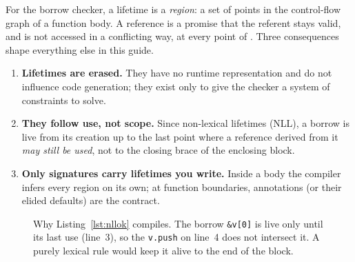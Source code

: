 \documentclass[10.5pt,a4paper]{article}
\newcounter{lst}
\begin{document}
For the borrow checker, a lifetime  is a \emph{region}: a set of points in the control-flow graph of a function
body. A reference  is a promise that the referent stays valid, and is not accessed in a conflicting way,
at every point of . Three consequences shape everything else in this guide.

\begin{enumerate}
\item \textbf{Lifetimes are erased.} They have no runtime representation and do not influence code generation;
  they exist only to give the checker a system of constraints to solve.
\item \textbf{They follow use, not scope.} Since non-lexical lifetimes (NLL), a borrow is live from its creation up
  to the last point where a reference derived from it \emph{may still be used}, not to the closing brace of the
  enclosing block.
\item \textbf{Only signatures carry lifetimes you write.} Inside a body the compiler infers every region on its own;
  at function boundaries, annotations (or their elided defaults) are the contract.
\end{enumerate}

\begin{figure}[h]
\centering
{}
\caption{Why Listing~\ref{lst:nllok} compiles. The borrow \texttt{\&v[0]} is live only until its last use (line~3), so the
\texttt{v.push} on line~4 does not intersect it. A purely lexical rule would keep it alive to the end of the block.}
\end{figure}
\end{document}
